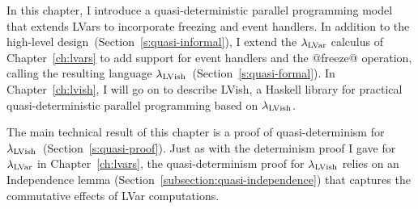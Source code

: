 In this chapter, I introduce a quasi-deterministic parallel
programming model that extends LVars to incorporate freezing and event
handlers.  In addition to the high-level
design~(Section~\ref{s:quasi-informal}), I extend the $\lambda_{\textrm{LVar}}$
calculus of Chapter~\ref{ch:lvars} to add support for event handlers
and the @freeze@ operation, calling the resulting language
$\lambda_{\textrm{LVish}}$~(Section~\ref{s:quasi-formal}).  In
Chapter~\ref{ch:lvish}, I will go on to describe LVish, a Haskell
library for practical quasi-deterministic parallel programming based
on $\lambda_{\textrm{LVish}}$.

The main technical result of this chapter is a proof of
quasi-determinism for
$\lambda_{\textrm{LVish}}$~(Section~\ref{s:quasi-proof}). Just as with the
determinism proof I gave for $\lambda_{\textrm{LVar}}$ in Chapter~\ref{ch:lvars},
the quasi-determinism proof for $\lambda_{\textrm{LVish}}$ relies on an
Independence lemma (Section~\ref{subsection:quasi-independence}) that
captures the commutative effects of LVar computations.




